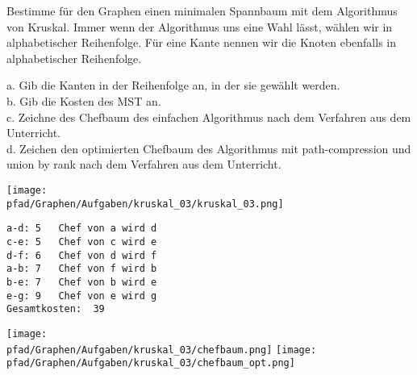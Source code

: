 ﻿\question[6]
Bestimme für den Graphen einen minimalen Spannbaum mit dem Algorithmus von Kruskal. Immer wenn der Algorithmus uns eine
Wahl lässt, wählen wir in alphabetischer Reihenfolge. Für eine Kante nennen wir die Knoten ebenfalls
in alphabetischer Reihenfolge.

a. Gib die Kanten in der Reihenfolge an, in der sie gewählt werden.  \\
b. Gib die Kosten des MST an. \\
c. Zeichne des Chefbaum des einfachen Algorithmus nach dem Verfahren aus dem Unterricht. \\
d. Zeichen den optimierten Chefbaum des Algorithmus mit path-compression und union by rank
nach dem Verfahren aus dem Unterricht.

\texttt{[image: \\pfad/Graphen/Aufgaben/kruskal\_03/kruskal\_03.png]}
\begin{solutionbox}{9cm}
\begin{lstlisting}
a-d: 5   Chef von a wird d
c-e: 5   Chef von c wird e
d-f: 6   Chef von d wird f
a-b: 7   Chef von f wird b
b-e: 7   Chef von b wird e
e-g: 9   Chef von e wird g
Gesamtkosten:  39
\end{lstlisting}
\texttt{[image: \\pfad/Graphen/Aufgaben/kruskal\_03/chefbaum.png]}
\texttt{[image: \\pfad/Graphen/Aufgaben/kruskal\_03/chefbaum\_opt.png]}
\end{solutionbox}

